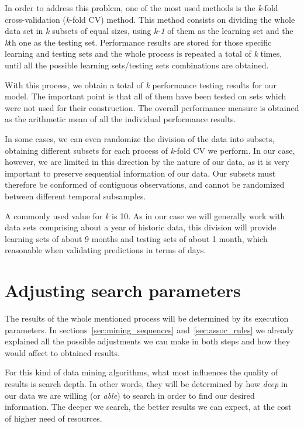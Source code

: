 \documentclass[a4paper,12pt]{article}
\begin{document}
In order to address this problem, one of the most used methods is the \textit{k}-fold cross-validation (\textit{k}-fold CV) method. This method consists on dividing the whole data set in \textit{k} subsets of equal sizes, using \textit{k-1} of them as the learning set and the \textit{k}th one as the testing set. Performance results are stored for those specific learning and testing sets and the whole process is repeated a total of \textit{k} times, until all the possible learning sets/testing sets combinations are obtained.

With this process, we obtain a total of \textit{k} performance testing results for our model. The important point is that all of them have been tested on sets which were not used for their construction. The overall performance measure is obtained as the arithmetic mean of all the individual performance results.

In some cases, we can even randomize the division of the data into subsets, obtaining different subsets for each process of \textit{k}-fold CV we perform. In our case, however, we are limited in this direction by the nature of our data, as it is very important to preserve sequential information of our data. Our subsets must therefore be conformed of contiguous observations, and cannot be randomized between different temporal subsamples.

A commonly used value for \textit{k} is 10. As in our case we will generally work with data sets comprising about a year of historic data, this division will provide learning sets of about 9 months and testing sets of about 1 month, which reasonable when validating predictions in terms of days.

\section{Adjusting search parameters}
\label{sec:search_parameters}
The results of the whole mentioned process will be determined by its execution parameters. In sections~\ref{sec:mining_sequences} and~\ref{sec:assoc_rules} we already explained all the possible adjustments we can make in both steps and how they would affect to obtained results. 

For this kind of data mining algorithms, what most influences the quality of results is search depth. In other words, they will be determined by how \emph{deep} in our data we are willing (or \emph{able}) to search in order to find our desired information. The deeper we search, the better results we can expect, at the cost of higher need of resources.
\end{document}
